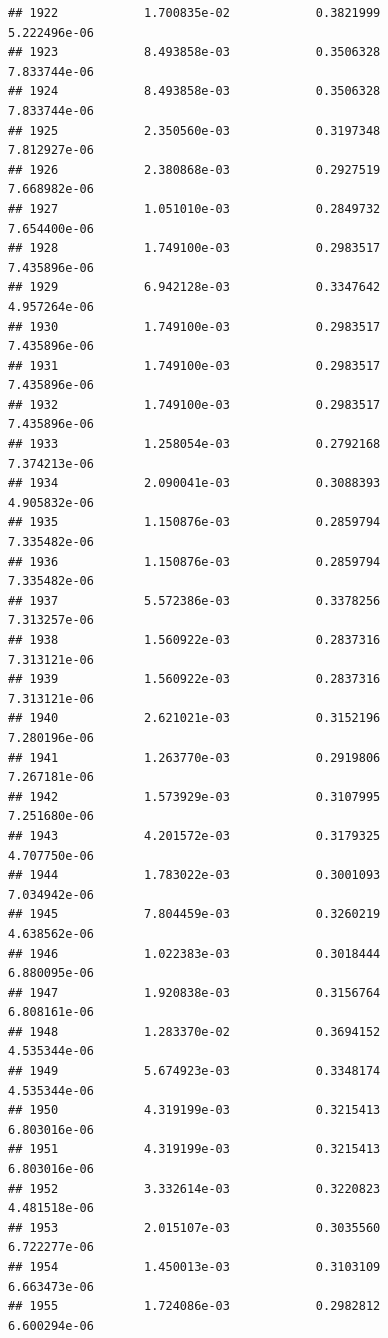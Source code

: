 \documentclass[
]{article}
\begin{document}
\begin{verbatim}
## 1922            1.700835e-02            0.3821999            5.222496e-06
## 1923            8.493858e-03            0.3506328            7.833744e-06
## 1924            8.493858e-03            0.3506328            7.833744e-06
## 1925            2.350560e-03            0.3197348            7.812927e-06
## 1926            2.380868e-03            0.2927519            7.668982e-06
## 1927            1.051010e-03            0.2849732            7.654400e-06
## 1928            1.749100e-03            0.2983517            7.435896e-06
## 1929            6.942128e-03            0.3347642            4.957264e-06
## 1930            1.749100e-03            0.2983517            7.435896e-06
## 1931            1.749100e-03            0.2983517            7.435896e-06
## 1932            1.749100e-03            0.2983517            7.435896e-06
## 1933            1.258054e-03            0.2792168            7.374213e-06
## 1934            2.090041e-03            0.3088393            4.905832e-06
## 1935            1.150876e-03            0.2859794            7.335482e-06
## 1936            1.150876e-03            0.2859794            7.335482e-06
## 1937            5.572386e-03            0.3378256            7.313257e-06
## 1938            1.560922e-03            0.2837316            7.313121e-06
## 1939            1.560922e-03            0.2837316            7.313121e-06
## 1940            2.621021e-03            0.3152196            7.280196e-06
## 1941            1.263770e-03            0.2919806            7.267181e-06
## 1942            1.573929e-03            0.3107995            7.251680e-06
## 1943            4.201572e-03            0.3179325            4.707750e-06
## 1944            1.783022e-03            0.3001093            7.034942e-06
## 1945            7.804459e-03            0.3260219            4.638562e-06
## 1946            1.022383e-03            0.3018444            6.880095e-06
## 1947            1.920838e-03            0.3156764            6.808161e-06
## 1948            1.283370e-02            0.3694152            4.535344e-06
## 1949            5.674923e-03            0.3348174            4.535344e-06
## 1950            4.319199e-03            0.3215413            6.803016e-06
## 1951            4.319199e-03            0.3215413            6.803016e-06
## 1952            3.332614e-03            0.3220823            4.481518e-06
## 1953            2.015107e-03            0.3035560            6.722277e-06
## 1954            1.450013e-03            0.3103109            6.663473e-06
## 1955            1.724086e-03            0.2982812            6.600294e-06

\end{verbatim}
\end{document}
